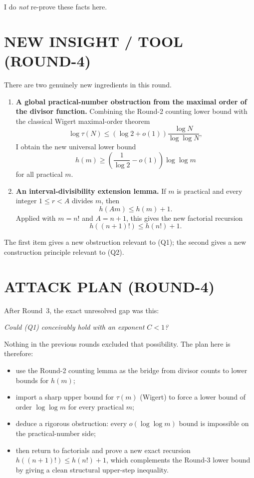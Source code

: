 I do \emph{not} re-prove these facts here.

\section{NEW INSIGHT / TOOL (ROUND-4)}

There are two genuinely new ingredients in this round.

\begin{enumerate}
\item \textbf{A global practical-number obstruction from the maximal order of the divisor function.}
Combining the Round-2 counting lower bound with the classical Wigert maximal-order theorem
\[
\log \tau(N)\le (\log 2+o(1))\frac{\log N}{\log\log N},
\]
I obtain the new universal lower bound
\[
h(m)\ge \left(\frac1{\log 2}-o(1)\right)\log\log m
\]
for all practical \(m\).

\item \textbf{An interval-divisibility extension lemma.}
If \(m\) is practical and every integer \(1\le r<A\) divides \(m\), then
\[
h(Am)\le h(m)+1.
\]
Applied with \(m=n!\) and \(A=n+1\), this gives the new factorial recursion
\[
h((n+1)!)\le h(n!)+1.
\]
\end{enumerate}

The first item gives a new obstruction relevant to (Q1); the second gives a new construction principle relevant to (Q2).

\section{ATTACK PLAN (ROUND-4)}

After Round~3, the exact unresolved gap was this:

\begin{center}
\emph{Could (Q1) conceivably hold with an exponent \(C<1\)?}
\end{center}

Nothing in the previous rounds excluded that possibility. The plan here is therefore:

\begin{itemize}
\item use the Round-2 counting lemma as the bridge from divisor counts to lower bounds for \(h(m)\);
\item import a sharp upper bound for \(\tau(m)\) (Wigert) to force a lower bound of order \(\log\log m\) for every practical \(m\);
\item deduce a rigorous obstruction: every \(o(\log\log m)\) bound is impossible on the practical-number side;
\item then return to factorials and prove a new exact recursion \(h((n+1)!)\le h(n!)+1\), which complements the Round-3 lower bound by giving a clean structural upper-step inequality.
\end{itemize}

